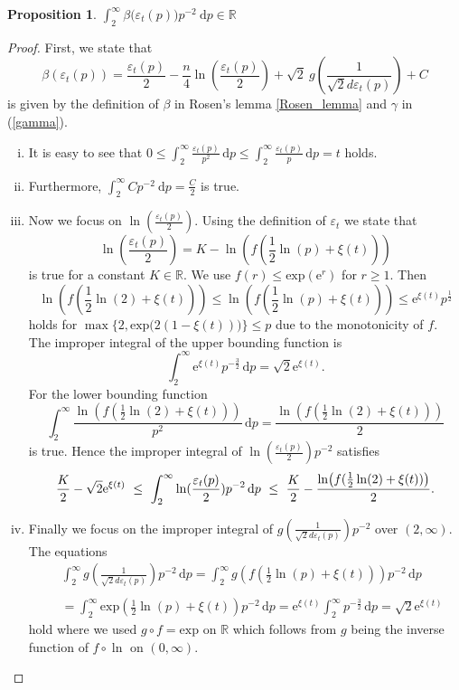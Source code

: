 \documentclass[12pt,longbibliography]{article}
\def\R{\mathbb{R}}
\def\d{\,\mathrm{d}}
\newtheorem{prp}[thm]{Proposition}
\theoremstyle{definition}
\theoremstyle{remark}
\theoremstyle{example}
\begin{document}
\begin{prp} \label{definition_Mt}
$\int_{2}^{\infty} \beta \bigl( \varepsilon_{t}(p) \bigr)p^{-2} \ \mathrm{d}p \in \R$
\end{prp}

\begin{proof}
First, we state that
$$
\beta \left( \varepsilon_{t}(p) \right) = 
\frac{\varepsilon_{t}(p)}{2} - \frac{n}{4} \ln( \frac{\varepsilon_{t}(p)}{2}) + \sqrt{2} \ g (\frac{1}{\sqrt{2} d \varepsilon_{t}(p)}) + C
$$ 
is given by the definition of $\beta$ in Rosen's lemma \ref{Rosen_lemma} and $\gamma$ in (\ref{gamma}).
\begin{enumerate}[i.)]
\item It is easy to see that
$
0 \leq \int_{2}^{\infty} \frac{\varepsilon_{t}(p)}{p^{2}} \d p \leq 
\int_{2}^{\infty} \frac{\varepsilon_{t}(p)}{p} \d p = t 
$ holds.
\item Furthermore, 
$
\int_{2}^{\infty} Cp^{-2} \ \mathrm{d}p = \frac{C}{2}
$
is true.
\item Now we focus on $ \ln( \frac{\varepsilon_{t}(p)}{2})$. Using the definition of $\varepsilon_{t}$ we state that
$$
 \ln \left( \frac{\varepsilon_{t}(p)}{2} \right) = K - \ln \left( f(\frac{1}{2} \ln(p) + \xi (t) ) \right)
$$
is true for a constant $K \in \R$. We use $f(r) \leq \mathrm{exp}(\mathrm{e}^{r})$ for $r \geq 1$. Then
$$
\ln \left( f(\frac{1}{2} \ln(2) + \xi (t) ) \right) \leq \ln \left( f(\frac{1}{2} \ln(p) + \xi (t) ) \right) 
\leq \mathrm{e}^{\xi (t)} p^{\frac{1}{2}}
$$
holds for $\max \{ 2, \mathrm{exp}\bigl(2(1 - \xi (t)) \bigr) \} \leq p$ due to the monotonicity of $f$. The improper 
integral of the upper bounding function is
$$
\int_{2}^{\infty} \mathrm{e}^{\xi (t)} p^{-\frac{3}{2}} \d p = \sqrt{2}\mathrm{e}^{\xi (t)}.
$$
For the lower bounding function 
$$
\int_{2}^{\infty} \frac{\ln \left( f(\frac{1}{2} \ln(2) + \xi (t) ) \right)}{p^{2}} \d p =  
\frac{\ln \left( f(\frac{1}{2} \ln(2) + \xi (t) ) \right)}{2}
$$
is true. Hence the improper integral of $\ln( \frac{\varepsilon_{t}(p)}{2}) p^{-2}$ satisfies 
$$
\frac{K}{2} - \sqrt{2}\mathrm{e}^{\xi (t)} \ \leq \ 
\int_{2}^{\infty} \ln( \frac{\varepsilon_{t}(p)}{2}) p^{-2} \d p \ \leq \ 
\frac{K}{2} -\frac{\ln \bigl( f(\frac{1}{2} \ln(2) + \xi (t) ) \bigr)}{2}. \\
$$
\item Finally we focus on the improper integral of $g (\frac{1}{\sqrt{2} d \varepsilon_{t}(p)}) p^{-2}$ over $(2,\infty)$. The equations
\begin{align*}
& \int_{2}^{\infty} g \left( \frac{1}{\sqrt{2} d \varepsilon_{t}(p)} \right) p^{-2} \d p
 = \int_{2}^{\infty} g \left( f \left( \frac{1}{2} \ln (p) + \xi (t) \right) \right) p^{-2} \d p \\
\ \\
& = \int_{2}^{\infty} \mathrm{exp} \left( \frac{1}{2} \ln (p) + \xi (t) \right) p^{-2} \d p
 = \mathrm{e}^{\xi (t)} \int_{2}^{\infty} p^{-\frac{3}{2}} \d p  = \sqrt{2} \mathrm{e}^{\xi (t)} 
\end{align*}
hold where we used $g \circ f = \mathrm{exp}$ on $\R$ which follows from $g$ being the inverse function of $f \circ \ln$ on $(0,\infty)$.
\end{enumerate}
\end{proof}


\newpage



\end{document}
